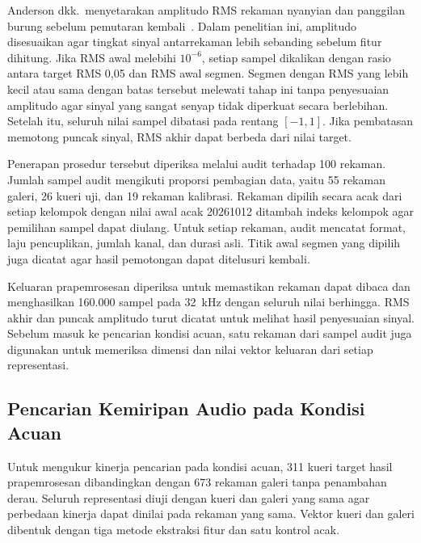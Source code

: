 Anderson dkk.\ menyetarakan amplitudo RMS rekaman nyanyian dan panggilan burung sebelum pemutaran kembali~\cite{anderson2021rms}. Dalam penelitian ini, amplitudo disesuaikan agar tingkat sinyal antarrekaman lebih sebanding sebelum fitur dihitung. Jika RMS awal melebihi $10^{-6}$, setiap sampel dikalikan dengan rasio antara target RMS 0{,}05 dan RMS awal segmen. Segmen dengan RMS yang lebih kecil atau sama dengan batas tersebut melewati tahap ini tanpa penyesuaian amplitudo agar sinyal yang sangat senyap tidak diperkuat secara berlebihan. Setelah itu, seluruh nilai sampel dibatasi pada rentang $[-1,1]$. Jika pembatasan memotong puncak sinyal, RMS akhir dapat berbeda dari nilai target.

Penerapan prosedur tersebut diperiksa melalui audit terhadap 100 rekaman. Jumlah sampel audit mengikuti proporsi pembagian data, yaitu 55 rekaman galeri, 26 kueri uji, dan 19 rekaman kalibrasi. Rekaman dipilih secara acak dari setiap kelompok dengan nilai awal acak 20261012 ditambah indeks kelompok agar pemilihan sampel dapat diulang. Untuk setiap rekaman, audit mencatat format, laju pencuplikan, jumlah kanal, dan durasi asli. Titik awal segmen yang dipilih juga dicatat agar hasil pemotongan dapat ditelusuri kembali.

Keluaran prapemrosesan diperiksa untuk memastikan rekaman dapat dibaca dan menghasilkan 160.000 sampel pada 32~kHz dengan seluruh nilai berhingga. RMS akhir dan puncak amplitudo turut dicatat untuk melihat hasil penyesuaian sinyal. Sebelum masuk ke pencarian kondisi acuan, satu rekaman dari sampel audit juga digunakan untuk memeriksa dimensi dan nilai vektor keluaran dari setiap representasi.

\subsection{Pencarian Kemiripan Audio pada Kondisi Acuan}
\label{subsec:e1}

Untuk mengukur kinerja pencarian pada kondisi acuan, 311 kueri target hasil prapemrosesan dibandingkan dengan 673 rekaman galeri tanpa penambahan derau. Seluruh representasi diuji dengan kueri dan galeri yang sama agar perbedaan kinerja dapat dinilai pada rekaman yang sama. Vektor kueri dan galeri dibentuk dengan tiga metode ekstraksi fitur dan satu kontrol acak.

